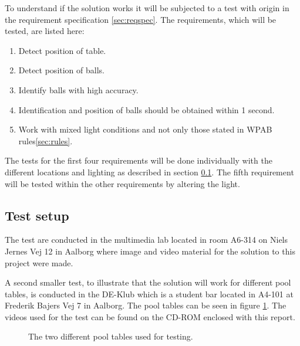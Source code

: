 To understand if the solution works it will be subjected to a test with origin in the requirement specification \ref{sec:reqspec}. The requirements, which will be tested, are listed here:

\begin{enumerate}
\setlength{\itemsep}{0mm}
	\item Detect position of table.
	\item Detect position of balls.
	\item Identify balls with high accuracy.
	\item Identification and position of balls should be obtained within 1 second.
	\item Work with mixed light conditions and not only those stated in WPAB rules\ref{sec:rules}.
\end{enumerate}

The tests for the first four requirements will be done individually with the different locations and lighting as described in section \ref{sec:testsetup}. The fifth requirement will be tested within the other requirements by altering the light.

\subsection{Test setup}
\label{sec:testsetup}
The test are conducted in the multimedia lab located in room A6-314 on Niels Jernes Vej 12 in Aalborg where image and video material for the solution to this project were made. 

A second smaller test, to illustrate that the solution will work for different pool tables, is conducted in the DE-Klub which is a student bar located in A4-101 at Frederik Bajers Vej 7 in Aalborg. The pool tables can be seen in figure \ref{fig:diffpool}. The videos used for the test can be found on the CD-ROM enclosed with this report.

\begin{figure}[H]
  \centering
  \quad           
   \caption{The two different pool tables used for testing.}
  \label{fig:diffpool}
\end{figure}


